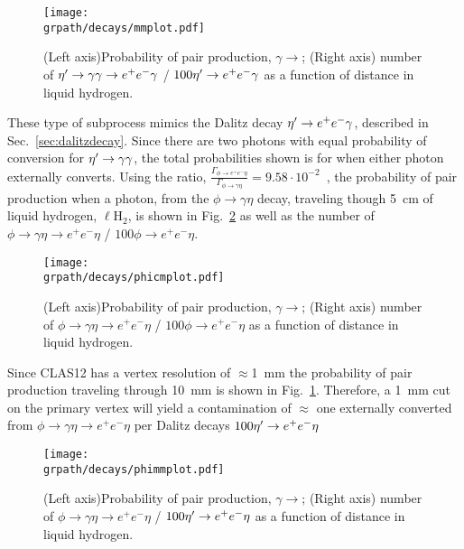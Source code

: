 	\begin{figure}[h!]\begin{center}
			\texttt{[image: \\grpath/decays/mmplot.pdf]}
			\caption[Probability of pair production, $\gamma \to$\epemT, as a function of distance in liquid hydrogen]{\label{fig:conversionmm}{(Left axis)Probability of pair production, $\gamma \to$\epemT; (Right axis) number of $\eta^{\prime} \to \gamma \gamma \rightarrow e^+e^- \gamma$ / $100 \eta^{\prime} \rightarrow e^+e^- \gamma$ as a function of distance in liquid hydrogen.}}
		\end{center}\end{figure}
		These type of subprocess mimics the Dalitz decay  $\eta^{\prime} \to e^+e^- \gamma$, described in Sec.~\ref{sec:dalitzdecay}. Since there are two photons with equal probability of conversion for $\eta^{\prime} \to \gamma \gamma$, the total probabilities shown is for when either photon externally converts.
		Using the ratio, $\frac{\Gamma_{\phi \to e^+e^- \eta}}{\Gamma_{\phi \to \gamma \eta}} = 9.58\cdot 10^{-2}$~\cite{pdg2014}, the probability of pair production when a photon, from the $\phi \to \gamma \eta$ decay, traveling though 5~cm of liquid hydrogen, $\ell$H$_2$, is shown in Fig.~\ref{fig:conversionphi} as well as the number of $\phi \to \gamma \eta \rightarrow e^+e^- \eta$ / $100 \phi \rightarrow e^+e^- \eta$. 
		\begin{figure}[h!]\begin{center}
				\texttt{[image: \\grpath/decays/phicmplot.pdf]}
				\caption[Probability of pair production, $\gamma \to$\epemT, as a function of distance in liquid hydrogen]{\label{fig:conversionphi}{(Left axis)Probability of pair production, $\gamma \to$\epemT; (Right axis) number of $\phi \to \gamma \eta \rightarrow e^+e^- \eta$ / $100 \phi \rightarrow e^+e^- \eta$ as a function of distance in liquid hydrogen.}}
			\end{center}\end{figure}
			Since CLAS12 has a vertex resolution of $\approx$1~mm the probability of pair production traveling through 10~mm is shown in Fig.~\ref{fig:conversionmm}. Therefore, a 1~mm cut on the primary vertex will yield a contamination of $\approx$ one externally converted \epemT from $\phi \to \gamma \eta \rightarrow e^+e^- \eta$ per Dalitz decays $100 \eta^{\prime} \rightarrow e^+e^- \eta$
			\begin{figure}[h!]\begin{center}
					\texttt{[image: \\grpath/decays/phimmplot.pdf]}
					\caption[Probability of pair production, $\gamma \to$\epemT, as a function of distance in liquid hydrogen]{\label{fig:conversionphimm}{(Left axis)Probability of pair production, $\gamma \to$\epemT; (Right axis) number of $\phi \to \gamma \eta \rightarrow e^+e^- \eta$ / $100 \eta^{\prime} \rightarrow e^+e^- \eta$ as a function of distance in liquid hydrogen.}}
				\end{center}\end{figure}

